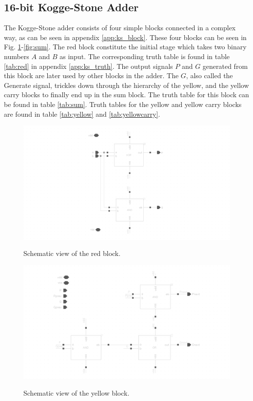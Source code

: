 \subsection{16-bit Kogge-Stone Adder}
The Kogge-Stone adder consists of four simple blocks connected in a complex way, as can be seen in appendix \ref{app:ks_block}. These four blocks can be seen in Fig. \ref{fig:red}-\ref{fig:sum}. The red block constitute the initial stage which takes two binary numbers $A$ and $B$ as input. The corresponding truth table is found in table \ref{tab:red} in appendix \ref{app:ks_truth}. The output signals $P$ and $G$ generated from this block are later used by other blocks in the adder. The $G$, also called the Generate signal, trickles down through the hierarchy of the yellow, and the yellow carry blocks to finally end up in the sum block. The truth table for this block can be found in table \ref{tab:sum}. Truth tables for the yellow and yellow carry blocks are found in table \ref{tab:yellow} and \ref{tab:yellowcarry}.

\begin{figure}[H]
  \centering
  \captionsetup{justification=centering}
  {\includegraphics[width=2.0\textwidth]{../figures/red}}
  \caption{Schematic view of the red block.} \label{fig:red}
\end{figure}

\begin{figure}[H]
  \centering
  \captionsetup{justification=centering}
  {\includegraphics[width=1.3\textwidth]{../figures/yellow}}
  \caption{Schematic view of the yellow block.} \label{fig:yellow}
\end{figure}

